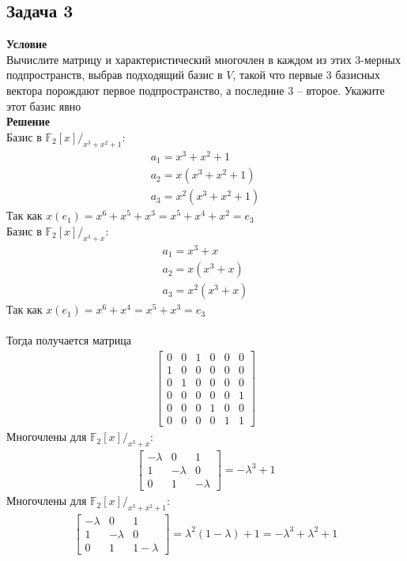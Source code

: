 		\subsection*{\textbf{Задача 3}}
		\textbf{Условие}\\
		Вычислите матрицу и характеристический многочлен в каждом из этих 3-мерных подпространств, выбрав подходящий базис в $V$, такой что первые 3 базисных вектора порождают первое подпространство, а последние 3 -- второе. Укажите этот базис явно\\
		\textbf{Решение}\\
		Базис в $\mathbb{F}_2[x]\slash_{x^3+x^2+1}:$
		\begin{gather*}
			a_1 = x^3 + x^2 + 1\\
			a_2 = x(x^3 + x^2 + 1)\\
			a_3 = x^2(x^3 + x^2 + 1)
		\end{gather*}
		Так как $x(e_1) = x^6 + x^5 + x^3 = x^5 + x^4 + x^2 = e_3$\\
		Базис в $\mathbb{F}_2[x]\slash_{x^3+x}:$
		\begin{gather*}
		a_1 = x^3 + x\\
		a_2 = x(x^3 + x)\\
		a_3 = x^2(x^3 + x)
		\end{gather*}
		Так как $x(e_1) = x^6 + x^4 = x^5 + x^3 = e_3$\\
		\\
		Тогда получается матрица
		\begin{gather*}
			\begin{bmatrix}
				0 & 0 & 1 & 0 & 0 & 0\\
				1 & 0 & 0 & 0 & 0 & 0\\
				0 & 1 & 0 & 0 & 0 & 0\\
				0 & 0 & 0 & 0 & 0 & 1\\
				0 & 0 & 0 & 1 & 0 & 0\\
				0 & 0 & 0 & 0 & 1 & 1
			\end{bmatrix}
		\end{gather*}
		Многочлены для $\mathbb{F}_2[x]\slash_{x^3+x}:$
		\begin{gather*}
			\begin{bmatrix}
				-\lambda & 0 & 1\\
				1 & -\lambda & 0\\
				0 & 1 & -\lambda
			\end{bmatrix}
			= -\lambda^3 + 1
		\end{gather*}
		Многочлены для $\mathbb{F}_2[x]\slash_{x^3+x^2+1}:$
		\begin{gather*}
			\begin{bmatrix}
				-\lambda & 0 & 1\\
				1 & -\lambda & 0\\
				0 & 1 & 1-\lambda
			\end{bmatrix}
			= \lambda^2(1-\lambda) + 1 = -\lambda^3 + \lambda^2 + 1
		\end{gather*}
		
